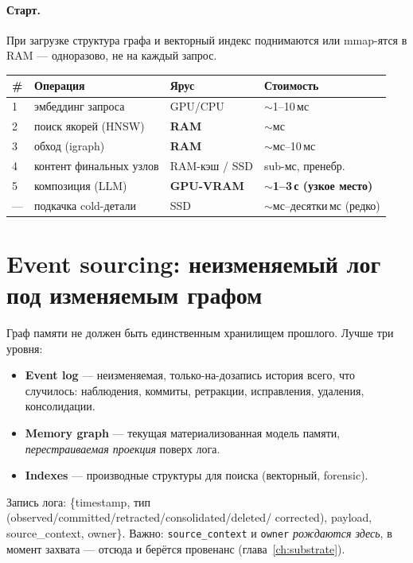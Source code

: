 \paragraph{Старт.} При загрузке структура графа и векторный индекс поднимаются или
mmap-ятся в RAM — одноразово, не на каждый запрос.

\begin{center}
\begin{tabular}{p{} p{} p{} p{}}
\toprule
\# & \textbf{Операция} & \textbf{Ярус} & \textbf{Стоимость} \\
\midrule
1 & эмбеддинг запроса & GPU/CPU & $\sim$1--10\,мс \\
2 & поиск якорей (HNSW) & \textbf{RAM} & $\sim$мс \\
3 & обход (igraph) & \textbf{RAM} & $\sim$мс--10\,мс \\
4 & контент финальных узлов & RAM-кэш / SSD & sub-мс, пренебр. \\
5 & композиция (LLM) & \textbf{GPU-VRAM} & \textbf{$\sim$1--3\,с (узкое место)} \\
— & подкачка cold-детали & SSD & $\sim$мс--десятки\,мс (редко) \\
\bottomrule
\end{tabular}
\end{center}

\section{Event sourcing: неизменяемый лог под изменяемым графом}
\label{sec:eventlog}

Граф памяти не должен быть единственным хранилищем прошлого. Лучше три уровня:
\begin{itemize}\itemsep1pt
\item \textbf{Event log} — неизменяемая, только-на-дозапись история всего, что
случилось: наблюдения, коммиты, ретракции, исправления, удаления, консолидации.
\item \textbf{Memory graph} — текущая материализованная модель памяти,
\emph{перестраиваемая проекция} поверх лога.
\item \textbf{Indexes} — производные структуры для поиска (векторный, forensic).
\end{itemize}
Запись лога: \{timestamp, тип (observed/committed/retracted/consolidated/deleted/
corrected), payload, source\_context, owner\}. Важно: \texttt{source\_context} и
\texttt{owner} \emph{рождаются здесь}, в момент захвата — отсюда и берётся провенанс
(глава~\ref{ch:substrate}).

